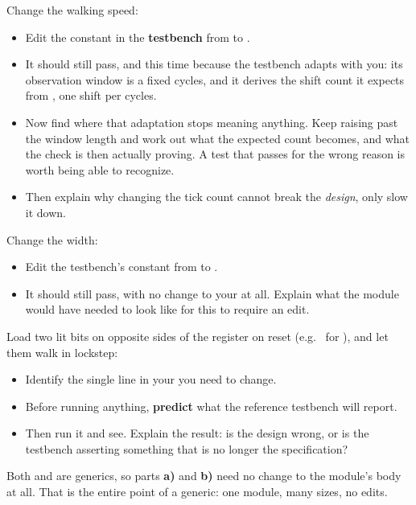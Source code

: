\begin{parts}
  \item Change the walking speed:
    \begin{itemize}
      \item Edit the  constant in the \textbf{testbench} from  to
        .
      \item It should still pass, and this time because the testbench adapts with you: its
        observation window is a fixed  cycles, and it derives the shift count it
        expects from , one shift per  cycles.
      \item Now find where that adaptation stops meaning anything. Keep raising 
        past the window length and work out what the expected count becomes, and what the check is
        then actually proving. A test that passes for the wrong reason is worth being able to
        recognize.
      \item Then explain why changing the tick count cannot break the \emph{design}, only slow it
        down.
    \end{itemize}
  \item Change the width:
    \begin{itemize}
      \item Edit the testbench's  constant from  to .
      \item It should still pass, with no change to your  at all. Explain
        what the module would have needed to look like for this to require an edit.
    \end{itemize}
  \item Load two lit bits on opposite sides of the register on reset (e.g.\  for
    ), and let them walk in lockstep:
    \begin{itemize}
      \item Identify the single line in your  you need to change.
      \item Before running anything, \textbf{predict} what the reference testbench will report.
      \item Then run it and see. Explain the result: is the design wrong, or is the testbench
        asserting something that is no longer the specification?
    \end{itemize}
\end{parts}
\note[Tip] Both  and  are generics, so parts \textbf{a)} and
\textbf{b)} need no change to the module's body at all. That is the entire point of a generic: one
module, many sizes, no edits.

